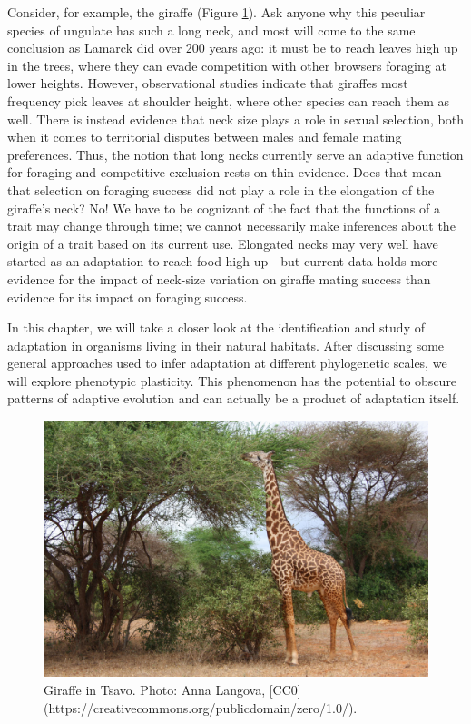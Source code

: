 \documentclass[
]{book}
\begin{document}
Consider, for example, the giraffe (Figure \ref{fig:giraffe}). Ask anyone why this peculiar species of ungulate has such a long neck, and most will come to the same conclusion as Lamarck did over 200 years ago: it must be to reach leaves high up in the trees, where they can evade competition with other browsers foraging at lower heights. However, observational studies indicate that giraffes most frequency pick leaves at shoulder height, where other species can reach them as well. There is instead evidence that neck size plays a role in sexual selection, both when it comes to territorial disputes between males and female mating preferences. Thus, the notion that long necks currently serve an adaptive function for foraging and competitive exclusion rests on thin evidence. Does that mean that selection on foraging success did not play a role in the elongation of the giraffe's neck? No! We have to be cognizant of the fact that the functions of a trait may change through time; we cannot necessarily make inferences about the origin of a trait based on its current use. Elongated necks may very well have started as an adaptation to reach food high up---but current data holds more evidence for the impact of neck-size variation on giraffe mating success than evidence for its impact on foraging success.

In this chapter, we will take a closer look at the identification and study of adaptation in organisms living in their natural habitats. After discussing some general approaches used to infer adaptation at different phylogenetic scales, we will explore phenotypic plasticity. This phenomenon has the potential to obscure patterns of adaptive evolution and can actually be a product of adaptation itself.

\begin{figure}
\includegraphics[width=1\linewidth]{images/giraffe} \caption{Giraffe in Tsavo. Photo: Anna Langova, [CC0](https://creativecommons.org/publicdomain/zero/1.0/).}\label{fig:giraffe}
\end{figure}
\end{document}
